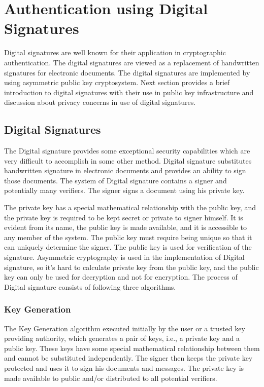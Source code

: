 \section{Authentication using Digital Signatures}
Digital signatures are well known for their application in cryptographic authentication. The digital signatures are viewed as a replacement of handwritten signatures for electronic documents. The digital signatures are implemented by using asymmetric public key cryptosystem. Next section provides a brief introduction to digital signatures with their use in public key infrastructure and discussion about privacy concerns in use of digital signatures.
\subsection{Digital Signatures}
The Digital signature provides some exceptional security capabilities which are very difficult to accomplish in some other method. Digital signature substitutes handwritten signature in electronic documents and provides an ability to sign those documents. The system of Digital signature contains a signer and potentially many verifiers. The signer signs a document using his private key. 

The private key has a special mathematical relationship with the public key, and the private key is required to be kept secret or private to signer himself. It is evident from its name, the public key is made available, and it is accessible to any member of the system. The public key must require being unique so that it can uniquely determine the signer. The public key is used for verification of the signature. Asymmetric cryptography is used in the implementation of Digital signature, so it's hard to calculate private key from the public key, and the public key can only be used for decryption and not for encryption. The process of Digital signature consists of following three algorithms.
\subsubsection{Key Generation} 
The Key Generation algorithm executed initially by the user or a trusted key providing authority, which generates a pair of keys, i.e., a private key and a public key. These keys have some special mathematical relationship between them and cannot be substituted independently. The signer then keeps the private key protected and uses it to sign his documents and messages. The private key is made available to public and/or distributed to all potential verifiers.
